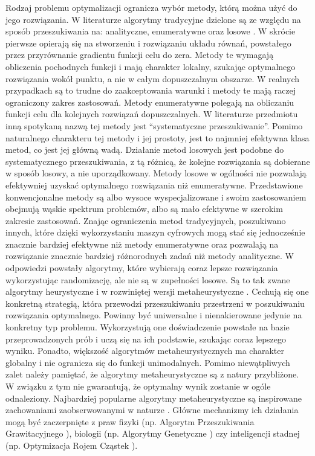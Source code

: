 Rodzaj problemu optymalizacji ogranicza wybór metody, którą można użyć do jego rozwiązania. W literaturze algorytmy tradycyjne dzielone są ze względu na sposób przeszukiwania na: analityczne, enumeratywne oraz losowe \parencite{Goldberg1995}. W skrócie pierwsze opierają się na stworzeniu i rozwiązaniu układu równań, powstałego przez przyrównanie gradientu funkcji celu do zera. Metody te wymagają obliczenia pochodnych funkcji i mają charakter lokalny, szukając optymalnego rozwiązania wokół punktu, a nie w całym dopuszczalnym obszarze. W realnych przypadkach są to trudne do zaakceptowania warunki i metody te mają raczej ograniczony zakres zastosowań. Metody enumeratywne polegają na obliczaniu funkcji celu dla kolejnych rozwiązań dopuszczalnych. W literaturze przedmiotu inną spotykaną nazwą tej metody jest \enquote{systematyczne przeszukiwanie}. Pomimo naturalnego charakteru tej metody i jej prostoty, jest to najmniej efektywna klasa metod, co jest jej główną wadą. Działanie metod losowych jest podobne do systematycznego przeszukiwania, z tą różnicą, że kolejne rozwiązania są dobierane w sposób losowy, a nie uporządkowany. Metody losowe w ogólności nie pozwalają efektywniej uzyskać optymalnego rozwiązania niż enumeratywne. Przedstawione konwencjonalne metody są albo wysoce wyspecjalizowane i swoim zastosowaniem obejmują wąskie spektrum problemów, albo są mało efektywne w szerokim zakresie zastosowań. Znając ograniczenia metod tradycyjnych, poszukiwano innych, które dzięki wykorzystaniu maszyn cyfrowych mogą stać się jednocześnie znacznie bardziej efektywne niż metody enumeratywne oraz pozwalają na rozwiązanie znacznie bardziej różnorodnych zadań niż metody analityczne. W odpowiedzi powstały algorytmy, które wybierają coraz lepsze rozwiązania wykorzystując randomizację, ale nie są w zupełności losowe. Są to tak zwane algorytmy heurystyczne i w rozwiniętej wersji metaheurystyczne \parencite{Blum2003}. Cechują się one konkretną strategią, która przewodzi przeszukiwaniu przestrzeni w poszukiwaniu rozwiązania optymalnego. Powinny być uniwersalne i nienakierowane jedynie na konkretny typ problemu. Wykorzystują one doświadczenie powstałe na bazie przeprowadzonych prób i uczą się na ich podstawie, szukając coraz lepszego wyniku. Ponadto, większość algorytmów metaheurystycznych ma charakter globalny i nie ogranicza się do funkcji unimodalnych. Pomimo niewątpliwych zalet należy pamiętać, że algorytmy metaheurystyczne są z natury przybliżone. W związku z tym nie gwarantują, że optymalny wynik zostanie w ogóle odnaleziony. Najbardziej popularne algorytmy metaheurystyczne są inspirowane zachowaniami zaobserwowanymi w naturze \parencite{FisterJr.2013}. Główne mechanizmy ich działania mogą być zaczerpnięte z praw fizyki (np. Algorytm Przeszukiwania Grawitacyjnego \parencite{Rashedi2009}), biologii (np. Algorytmy Genetyczne \parencite{Goldberg1995}) czy inteligencji stadnej (np. Optymizacja Rojem Cząstek \parencite{Clerc2010,Eberhart2001}).
